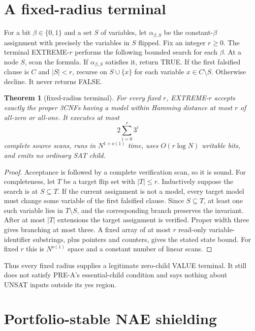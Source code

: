 \documentclass[11pt]{article}
\newtheorem{theorem}{Theorem}
\begin{document}
\section{A fixed-radius terminal}

For a bit $\beta\in\{0,1\}$ and a set $S$ of variables, let
$\alpha_{\beta,S}$ be the constant-$\beta$ assignment with precisely the
variables in $S$ flipped.  Fix an integer $r\ge0$.  The terminal
\textsc{EXTREME-$r$} performs the following bounded search for each $\beta$.
At a node $S$, scan the formula.  If $\alpha_{\beta,S}$ satisfies it, return
TRUE.  If the first falsified clause is $C$ and $|S|<r$, recurse on
$S\cup\{x\}$ for each variable $x\in C\setminus S$.  Otherwise decline.
It never returns FALSE.

\begin{theorem}[fixed-radius terminal]
For every fixed $r$, \textsc{EXTREME-$r$} accepts exactly the proper 3CNFs
having a model within Hamming distance at most $r$ of all-zero or all-one.
It executes at most
\[
 2\sum_{i=0}^{r}3^i
\]
complete source scans, runs in $N^{1+o(1)}$ time, uses $O(r\log N)$ writable
bits, and emits no ordinary SAT child.
\end{theorem}
\begin{proof}
Acceptance is followed by a complete verification scan, so it is sound.
For completeness, let $T$ be a target flip set with $|T|\le r$.  Inductively
suppose the search is at $S\subseteq T$.  If the current assignment is not a
model, every target model must change some variable of the first falsified
clause.  Since $S\subseteq T$, at least one such variable lies in
$T\setminus S$, and the corresponding branch preserves the invariant.
After at most $|T|$ extensions the target assignment is verified.  Proper
width three gives branching at most three.  A fixed array of at most $r$
read-only variable-identifier substrings, plus pointers and counters, gives
the stated state bound.  For fixed $r$ this is $N^{o(1)}$ space and a
constant number of linear scans.
\end{proof}

Thus every fixed radius supplies a legitimate zero-child VALUE terminal.  It
still does not satisfy PRE-A's essential-child condition and says nothing
about UNSAT inputs outside its yes region.

\section{Portfolio-stable NAE shielding}
\end{document}

